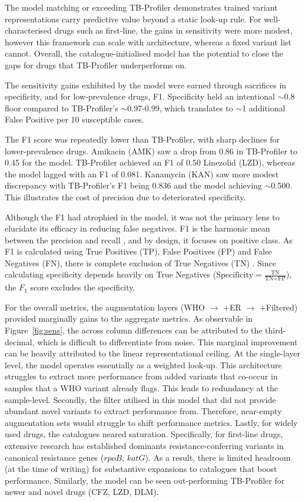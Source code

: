 The model matching or exceeding TB-Profiler demonstrates trained variant representations carry predictive value beyond a static look-up rule. For well-characterised drugs such as first-line, the gains in sensitivity were more modest, however this framework can scale with architecture, whereas a fixed variant list cannot. Overall, the catalogue-initialised model has the potential to close the gaps for drugs that TB-Profiler underperforms on.

The sensitivity gains exhibited by the model were earned through sacrifices in specificity, and for low-prevalence drugs, F1. Specificity held an intentional $\sim$0.8 floor compared to TB-Profiler's $\sim$0.97-0.99, which translates to $\sim$1 additional False Positive per 10 susceptible cases. 

The F1 score was repeatedly lower than TB-Profiler, with sharp declines for lower-prevalence drugs. Amikacin (AMK) saw a drop from 0.86 in TB-Profiler to 0.45 for the model. TB-Profiler achieved an F1 of 0.50 Linezolid (LZD), whereas the model lagged with an F1 of 0.081. Kanamycin (KAN) saw more modest discrepancy with TB-Profiler's F1 being 0.836 and the model achieving $\sim$0.500. This illustrates the cost of precision due to deteriorated specificity. 

Although the F1 had atrophied in the model, it was not the primary lens to elucidate its efficacy in reducing false negatives. F1 is the harmonic mean between the precision and recall \cite{Takahashietal2023}, and by design, it focuses on positive class. As F1 is calculated using True Positives (TP), False Positives (FP) and False Negatives (FN), there is complete exclusion of True Negatives (TN) \cite{Powers2015}. Since calculating specificity depends heavily on True Negatives ($\text{Specificity}=\frac{\text{TN}}{\text{TN}+\text{FP}}$), the $F_{1}$ score excludes the specificity.

For the overall metrics, the augmentation layers (WHO $\rightarrow$ +ER $\rightarrow$ +Filtered) provided marginally gains to the aggregate metrics. As observable in Figure~\ref{fig:sens}, the across column differences can be attributed to the third-decimal, which is difficult to differentiate from noise. This marginal improvement can be heavily attributed to the linear representational ceiling. At the single-layer level, the model operates essentially as a weighted look-up. This architecture struggles to extract more performance from added variants that co-occur in samples that a WHO variant already flags. This leads to redundancy at the sample-level. Secondly, the filter utilised in this model that did not provide abundant novel variants to extract performance from. Therefore, near-empty augmentation sets would struggle to shift performance metrics. Lastly, for widely used drugs, the catalogues neared saturation. Specifically, for first-line drugs, extensive research has established dominants resistance-conferring variants in canonical resistance genes ($rpoB$, $katG$). As a result, there is limited headroom (at the time of writing) for substantive expansions to catalogues that boost performance. Similarly, the model can be seen out-performing TB-Profiler for newer and novel drugs (CFZ, LZD, DLM).

